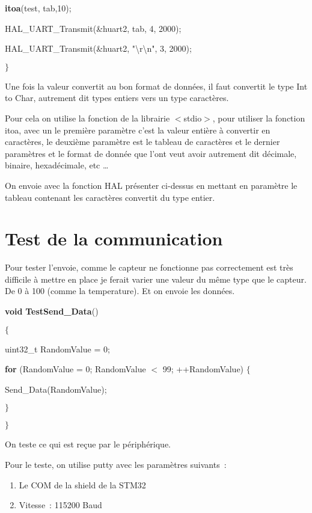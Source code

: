  \textbf{itoa}(test, tab,10);

 HAL\_UART\_Transmit(\&huart2, tab, 4, 2000);

 HAL\_UART\_Transmit(\&huart2, "{\textbackslash}r{\textbackslash}n", 3, 2000);

\noindent $\mathrm{\}}$

\noindent Une fois la valeur convertit au bon format de donn\'{e}es, il faut convertit le type Int to Char, autrement dit types entiers vers un type caract\`{e}res.

\noindent Pour cela on utilise la fonction de la librairie $\mathrm{<}$stdio$\mathrm{>}$, pour utiliser la fonction itoa, avec un le premi\`{e}re param\`{e}tre c'est la valeur enti\`{e}re \`{a} convertir en caract\`{e}res, le deuxi\`{e}me param\`{e}tre est le tableau de caract\`{e}res et le dernier param\`{e}tres et le format de donn\'{e}e que l'ont veut avoir autrement dit d\'{e}cimale, binaire, hexad\'{e}cimale, etc {\dots}

\noindent On envoie avec la fonction HAL pr\'{e}senter ci-dessus en mettant en param\`{e}tre le tableau contenant les caract\`{e}res convertit du type entier.

\noindent 


\section{ Test de la communication}

\noindent 

\noindent Pour tester l'envoie, comme le capteur ne fonctionne pas correctement est tr\`{e}s difficile \`{a} mettre en place je ferait varier une valeur du m\^{e}me type que le capteur. De 0 \`{a} 100 (comme la temperature). Et on envoie les donn\'{e}es.

\noindent \textbf{void} \textbf{TestSend\_Data}()

\noindent $\mathrm{\{}$

 uint32\_t RandomValue = 0;

\noindent 

 \textbf{for} (RandomValue = 0; RandomValue $\mathrm{<}$ 99; ++RandomValue) $\mathrm{\{}$

\noindent 

  Send\_Data(RandomValue);

 $\mathrm{\}}$

\noindent $\mathrm{\}}$

\noindent 

 On teste ce qui est re\c{c}ue par le p\'{e}riph\'{e}rique.

\noindent Pour le teste, on utilise putty avec les param\`{e}tres suivants~:

\begin{enumerate}
\item  Le COM de la shield de la STM32

\item  Vitesse~: 115200 Baud
\end{enumerate}
